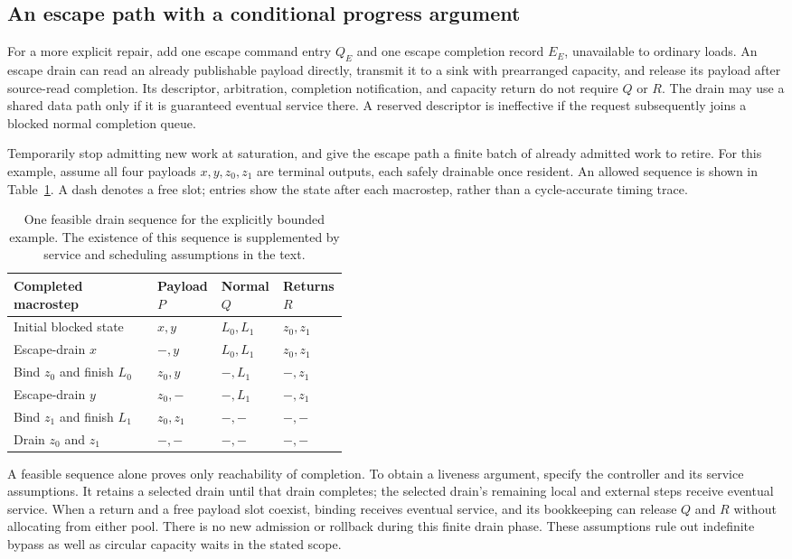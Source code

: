 \subsection{An escape path with a conditional progress argument}

For a more explicit repair, add one escape command entry $Q_E$ and one escape completion record $E_E$, unavailable to ordinary loads. An escape drain can read an already publishable payload directly, transmit it to a sink with prearranged capacity, and release its payload after source-read completion. Its descriptor, arbitration, completion notification, and capacity return do not require $Q$ or $R$. The drain may use a shared data path only if it is guaranteed eventual service there. A reserved descriptor is ineffective if the request subsequently joins a blocked normal completion queue.

Temporarily stop admitting new work at saturation, and give the escape path a finite batch of already admitted work to retire. For this example, assume all four payloads $x,y,z_0,z_1$ are terminal outputs, each safely drainable once resident. An allowed sequence is shown in Table~\ref{tab:u008-drain}. A dash denotes a free slot; entries show the state after each macrostep, rather than a cycle-accurate timing trace.
\begin{table}[tbp]
\centering
\small
\begin{tabularx}{\linewidth}{@{}p{0.43\linewidth}XXX@{}}
\toprule
Completed macrostep & Payload $P$ & Normal $Q$ & Returns $R$ \\
\midrule
Initial blocked state & $x,y$ & $L_0,L_1$ & $z_0,z_1$ \\
Escape-drain $x$ & $-,y$ & $L_0,L_1$ & $z_0,z_1$ \\
Bind $z_0$ and finish $L_0$ & $z_0,y$ & $-,L_1$ & $-,z_1$ \\
Escape-drain $y$ & $z_0,-$ & $-,L_1$ & $-,z_1$ \\
Bind $z_1$ and finish $L_1$ & $z_0,z_1$ & $-,-$ & $-,-$ \\
Drain $z_0$ and $z_1$ & $-,-$ & $-,-$ & $-,-$ \\
\bottomrule
\end{tabularx}
\caption{One feasible drain sequence for the explicitly bounded example. The existence of this sequence is supplemented by service and scheduling assumptions in the text.}
\label{tab:u008-drain}
\end{table}

A feasible sequence alone proves only reachability of completion. To obtain a liveness argument, specify the controller and its service assumptions. It retains a selected drain until that drain completes; the selected drain's remaining local and external steps receive eventual service. When a return and a free payload slot coexist, binding receives eventual service, and its bookkeeping can release $Q$ and $R$ without allocating from either pool. There is no new admission or rollback during this finite drain phase. These assumptions rule out indefinite bypass as well as circular capacity waits in the stated scope.

